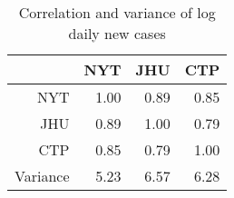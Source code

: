 \begin{table}[ht]
\centering
\begin{tabular}{rrrr}
  \hline
 & NYT & JHU & CTP \\ 
  \hline
NYT & 1.00 & 0.89 & 0.85 \\ 
  JHU & 0.89 & 1.00 & 0.79 \\ 
  CTP & 0.85 & 0.79 & 1.00 \\ 
  Variance & 5.23 & 6.57 & 6.28 \\ 
   \hline
\end{tabular}
\caption{Correlation and variance of log daily new cases\label{tab:newcasecor}} 
\end{table}
